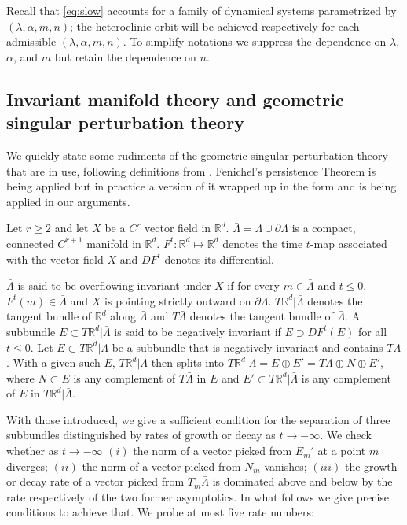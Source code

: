 \documentclass[usletter,11pt]{article}
\def\blue{\color{blue}}
\theoremstyle{remark}
\begin{document}
Recall that \eqref{eq:slow} accounts for a family of dynamical systems parametrized by $(\lambda,\alpha,m,n)$; the heteroclinic orbit will be achieved respectively for each admissible $(\lambda,\alpha,m,n)$. To simplify notations we suppress the dependence on $\lambda$, $\alpha$, and $m$ but retain
the dependence on $n$.

\subsection{Invariant manifold theory and geometric singular perturbation theory}\label{sec:singpert}
We quickly state some rudiments of the geometric singular perturbation theory that are in use, following definitions from \cite{fenichel_asymptotic_1977,fenichel_geometric_1979}. %
Fenichel's persistence Theorem \cite[Theorem 9.1]{fenichel_geometric_1979} is being applied but in practice a version of it wrapped up in the form \cite[Theorem 2.2]{Sz1991} and \cite[Theorem 3.1]{Sz1991} is being applied in our arguments. 

Let $r\ge2$ and let $X$ be a $C^{r}$ vector field in $\mathbb{R}^d$. $\bar{\Lambda}=\Lambda \cup \partial \Lambda$ is a compact, connected $C^{r+1}$ manifold in $\mathbb{R}^d$. $F^t: \mathbb{R}^d \mapsto \mathbb{R}^d$ denotes the time $t$-map associated with the vector field $X$ and $DF^t$ denotes its differential. 

$\bar{\Lambda}$ is said to be overflowing invariant under $X$ if for every $m\in\bar{\Lambda}$ and $t\le0$, $F^t(m)\in \bar{\Lambda}$ and $X$ is pointing strictly outward on $\partial \Lambda$. $T \mathbb{R}^d|\bar\Lambda$ denotes the tangent bundle of $\mathbb{R}^d$ along $\bar\Lambda$ and $T\bar\Lambda$ denotes the tangent bundle of $\bar\Lambda$. A subbundle $E\subset T\mathbb{R}^d|\bar{\Lambda}$ is said to be negatively invariant if $E \supset DF^t(E)$ for all $t\le0$. Let $E\subset T\mathbb{R}^d|\bar{\Lambda}$ be a subbundle that is negatively invariant and contains $T\bar\Lambda$. With a given such $E$,  $T \mathbb{R}^d| \bar\Lambda$ then splits into $T\mathbb{R}^d|\bar{\Lambda} =E\oplus E'= T\bar\Lambda\oplus N\oplus E'$, where $N\subset E$ is any complement of $T\bar\Lambda$ in $E$ and $E'\subset T\mathbb{R}^d|\bar{\Lambda}$ is any complement of $E$ in $T\mathbb{R}^d|\bar{\Lambda}$.  

With those introduced, we give a sufficient condition for the separation of three subbundles {\blue distinguished by rates of growth or decay as $t \rightarrow -\infty$.} We check whether as $t \rightarrow -\infty$ $(i)$ the norm of a vector picked from $E_m'$ at a point $m$ diverges; $(ii)$ the norm of a vector picked from $N_m$ vanishes; $(iii)$ the growth or decay rate of a vector picked from $T_m\bar\Lambda$ is dominated above and below by the rate respectively of the two former asymptotics. In what follows we give precise conditions to achieve that. We probe at most five rate numbers: 
\end{document}
